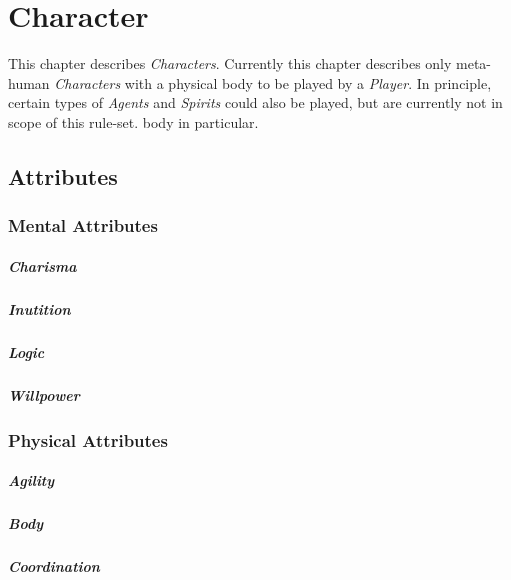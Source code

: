 \chapter{Character}

This chapter describes \emph{Characters}. Currently this chapter describes only
meta-human \emph{Characters} with a physical body to be played by a \emph{Player}.
In principle, certain types of \emph{Agents} and \emph{Spirits} could also be played,
but are currently not in scope of this rule-set.
body in particular.

\section{Attributes}
\subsection{Mental Attributes}
\paragraph{Charisma}

\paragraph{Inutition}

\paragraph{Logic}

\paragraph{Willpower}

\subsection{Physical Attributes}
\paragraph{Agility}

\paragraph{Body}

\paragraph{Coordination}

